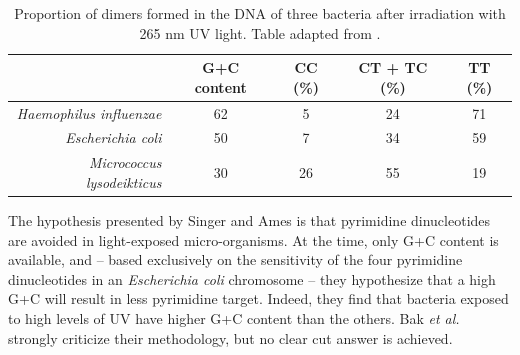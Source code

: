 \documentclass{article}
\begin{document}
\begin{table}[H]
\begin{center}
\begin{tabular}{rcccc}
  \hline \hline
  & G+C content & CC (\%) & CT + TC (\%) & TT (\%)\\
  \hline
  \textit{Haemophilus influenzae} & 62 & 5 & 24 & 71 \\
  \textit{Escherichia coli} & 50 & 7 & 34 & 59 \\
  \textit{Micrococcus lysodeikticus} & 30 & 26 & 55 & 19 \\
  \hline \hline
\end{tabular}
\caption{Proportion of dimers formed in the DNA of three bacteria
  after irradiation with 265 nm UV light. Table adapted from
  \cite{Setlow}.}
\label{sensitivity}
\end{center}
\end{table}


The hypothesis presented by Singer and Ames \cite{Singer} is that
pyrimidine dinucleotides are avoided in light-exposed micro-organisms.
At the time, only G+C content is available, and -- based exclusively
on the sensitivity of the four pyrimidine dinucleotides in an
\textit{Escherichia coli} chromosome -- they hypothesize that a high
G+C will result in less pyrimidine target. Indeed, they find that
bacteria exposed to high levels of UV have higher G+C content than the
others. Bak \textit{et al.} \cite{Bak} strongly criticize their
methodology, but no clear cut answer is achieved.
\end{document}
